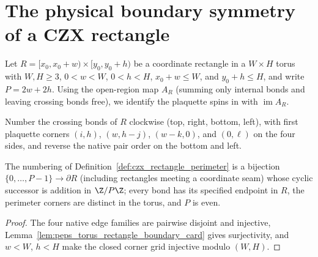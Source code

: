\section{The physical boundary symmetry of a CZX rectangle}%
\label{sec:peps_czx_rectangle_boundary}

Let $R=\lbrack x_0,x_0+w)\times\lbrack y_0,y_0+h)$ be a coordinate rectangle in a
$W\times H$ torus with $W,H\ge3$, $0<w<W$, $0<h<H$, $x_0+w\le W$, and
$y_0+h\le H$, and write $P=2w+2h$. Using the open-region map $A_R$ (summing
only internal bonds and leaving crossing bonds free), we identify the
plaquette spins in \cite[lines~330--345]{ChenLiuWen2011CZX} with $\operatorname{im}A_R$.

\begin{definition}%
    \label{def:czx_rectangle_perimeter}
    \leanok
    Number the crossing bonds of $R$ clockwise (top, right, bottom, left),
    with first plaquette corners $(i,h)$, $(w,h-j)$, $(w-k,0)$, and $(0,\ell)$
    on the four sides, and reverse the native pair order on the bottom and left.
\end{definition}

\begin{lemma}%
    \label{thm:czx_rectangle_perimeter}
    \leanok
    The numbering of Definition~\ref{def:czx_rectangle_perimeter} is a
    bijection $\{0,\ldots,P-1\}\to\partial R$ (including rectangles meeting a
    coordinate seam) whose cyclic successor is addition in $\Z/P\Z$; every bond
    has its specified endpoint in $R$, the perimeter corners are distinct in
    the torus, and $P$ is even.
\end{lemma}
\begin{proof}\leanok
    The four native edge families are pairwise disjoint and injective,
    Lemma~\ref{lem:peps_torus_rectangle_boundary_card} gives surjectivity, and
    $w<W$, $h<H$ make the closed corner grid injective modulo $(W,H)$.
\end{proof}


